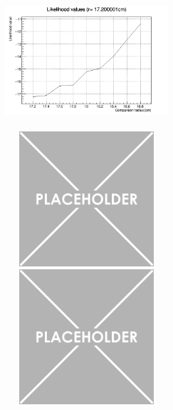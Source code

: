 \documentclass[a4paper, 11pt]{report}
\begin{document}
\begin{figure}[htbp]
\centering
\begin{minipage}[b]{.32\textwidth}
\includegraphics[width=6cm, height=5cm]{figs/likelihood17p2.png}
\end{minipage}\hfill
\begin{minipage}[b]{.32\textwidth}
\includegraphics[width=6cm, height=5cm]{figs/placeholder.png}
\end{minipage} \hfill
\begin{minipage}[b]{.32\textwidth}
\includegraphics[width=6cm, height=5cm]{figs/placeholder.png}
\end{minipage} \hfill \vspace{10pt}


\end{figure}
\end{document}
